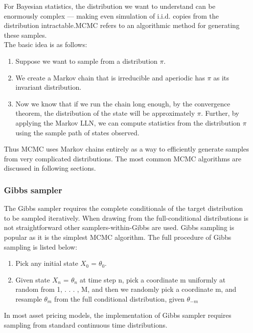\documentclass[letterpaper]{article}
\begin{document}
	For Bayesian statistics, the distribution we want to understand can be enormously complex — making even simulation of i.i.d. copies from the distribution intractable.MCMC refers to an algorithmic method for generating these samples. \\
	The basic idea is as follows:
	\begin{enumerate}
		\item Suppose we want to sample from a distribution $\pi$.
		\item We create a Markov chain that is irreducible and aperiodic has $\pi$ as its invariant distribution.
		\item Now we know that if we run the chain long enough, by the convergence theorem, the distribution of the state will be approximately $\pi$. Further, by applying the Markov LLN, we can compute statistics from the distribution $\pi$ using the sample path of states observed.
	\end{enumerate}
	
	Thus MCMC uses Markov chains entirely as a way to efficiently generate samples from very complicated distributions. The most common MCMC algorithms are discussed in following sections.  
	
	\subsubsection{Gibbs sampler}
	The Gibbs sampler requires the complete conditionals of the target distribution to be sampled iteratively. When drawing from the full-conditional distributions is not straightforward other samplers-within-Gibbs are used. Gibbs sampling is popular as it is the simplest MCMC algorithm.
	The full procedure of Gibbs sampling is listed below:
	\begin{enumerate}
		\item Pick any initial state $X_{0}$ = $\theta_{0}$.
		\item Given state $X_{n}$ = $\theta_{n}$ at time step n, pick a coordinate m uniformly at random from {1, . . . , M}, and then we randomly pick a coordinate m, and resample $\theta_{m}$ from the full conditional distribution, given $\theta_{-m}$
	\end{enumerate}
	In most asset pricing models, the implementation of Gibbs sampler requires sampling from standard continuous time distributions.
	
\end{document}

